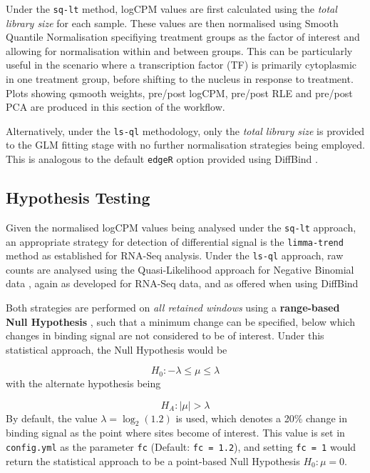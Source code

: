 \documentclass[
]{book}
\begin{document}
Under the \texttt{sq-lt} method, logCPM values are first calculated using the \emph{total library size} for each sample.
These values are then normalised using Smooth Quantile Normalisation\citep{qsmooth} specifiying treatment groups as the factor of interest and allowing for normalisation within and between groups.
This can be particularly useful in the scenario where a transcription factor (TF) is primarily cytoplasmic in one treatment group, before shifting to the nucleus in response to treatment.
Plots showing qsmooth weights, pre/post logCPM, pre/post RLE \citep{rle} and pre/post PCA are produced in this section of the workflow.

Alternatively, under the \texttt{ls-ql} methodology, only the \emph{total library size} is provided to the GLM fitting stage with no further normalisation strategies being employed.
This is analogous to the default \texttt{edgeR} option provided using DiffBind \citep{diffbind}.

\hypertarget{hypothesis-testing}{%
\subsection*{Hypothesis Testing}\label{hypothesis-testing}}

Given the normalised logCPM values being analysed under the \texttt{sq-lt} approach, an appropriate strategy for detection of differential signal is the \texttt{limma-trend} method \citep{voom} as established for RNA-Seq analysis.
Under the \texttt{ls-ql} approach, raw counts are analysed using the Quasi-Likelihood approach for Negative Binomial data \citep{qlf}, again as developed for RNA-Seq data, and as offered when using DiffBind \citep{diffbind}

Both strategies are performed on \emph{all retained windows} using a \textbf{range-based Null Hypothesis} \citep{treat}, such that a minimum change can be specified, below which changes in binding signal are not considered to be of interest.
Under this statistical approach, the Null Hypothesis would be

\[
H_0: -\lambda \leq \mu \leq \lambda
\]
with the alternate hypothesis being

\[
H_A: |\mu| > \lambda
\]
By default, the value \(\lambda = \log_2(1.2)\) is used, which denotes a 20\% change in binding signal as the point where sites become of interest.
This value is set in \texttt{config.yml} as the parameter \texttt{fc} (Default: \texttt{fc\ =\ 1.2}), and setting \texttt{fc\ =\ 1} would return the statistical approach to be a point-based Null Hypothesis \(H_0: \mu = 0\).
\end{document}
